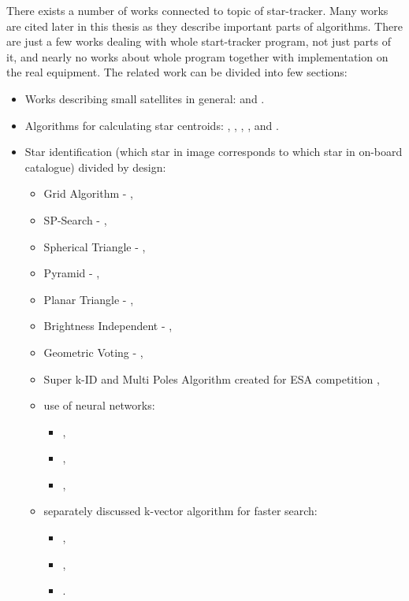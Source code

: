 \documentclass[12pt,a4paper,twoside]{article}
\begin{document}
There exists a number of works connected to topic of star-tracker. Many works are cited later in this thesis as they describe important parts of algorithms. There are just a few works dealing with whole start-tracker program, not just parts of it, and nearly no works about whole program together with implementation on the real equipment. The related work can be divided into few sections:

\begin{itemize}[noitemsep]
\item Works describing small satellites in general: \citet{heidt2000cubesat} and \citet{swartwout2011brief}.

\item Algorithms for calculating star centroids: \citet{liebe2002accuracy}, \citet{samaan2002predictive}, \citet{knutson2012fast}, \citet{azizabadi2014vlsi}, \citet{lindh2014development} and \citet{zhang2014brightness}. 

\item Star identification (which star in image corresponds to which star in on-board catalogue) divided by design:
\begin{itemize}[noitemsep]
\item Grid Algorithm - \citet{padgett1997grid}, 
\item SP-Search - \citet{mortari1999sp},
\item Spherical Triangle - \citet{cole2004fast}, 
\item Pyramid - \citet{mortari2004pyramid}, 
\item Planar Triangle - \citet{cole2006fast}, 
\item Brightness Independent - \citet{dong2006brightness},
\item Geometric Voting - \citet{kolomenkin2008geometric}, 
\item Super k-ID and Multi Poles Algorithm created for ESA competition \cite{esa-competition},
\item use of neural networks: 
\begin{itemize}[noitemsep]
\item \citet{lindbladstar},
\item \citet{li2003star}, 
\item \citet{miri2012star}, 
\end{itemize}
\item separately discussed k-vector algorithm for faster search:
\begin{itemize}[noitemsep]
\item \citet{mortari1996fast}, 
\item \citet{mortari2000k},
\item \citet{mortari2013k}. 
\end{itemize}
\end{itemize}


\end{itemize}
\end{document}
